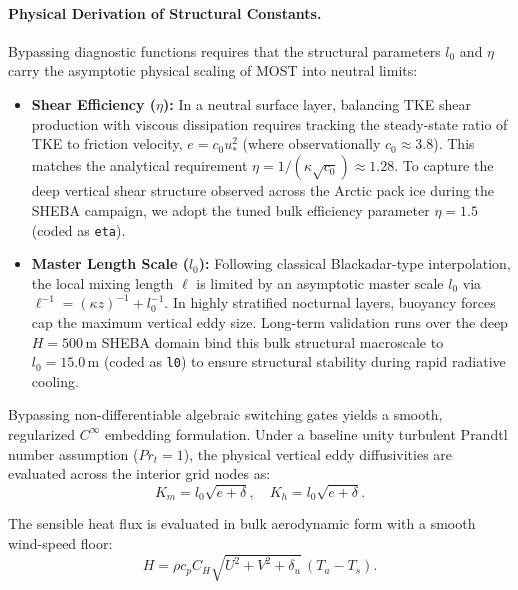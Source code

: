 \documentclass[11pt,letterpaper]{article}
\begin{document}
\paragraph{Physical Derivation of Structural Constants.}
Bypassing diagnostic functions requires that the structural parameters $l_0$ and $\eta$ carry the asymptotic physical scaling of MOST into neutral limits:
\begin{itemize}
    \item \textbf{Shear Efficiency ($\eta$):} In a neutral surface layer, balancing TKE shear production with viscous dissipation requires tracking the steady-state ratio of TKE to friction velocity, $e = c_0 u_*^2$ (where observationally $c_0 \approx 3.8$). This matches the analytical requirement $\eta = 1 / (\kappa \sqrt{c_0}) \approx 1.28$. To capture the deep vertical shear structure observed across the Arctic pack ice during the SHEBA campaign, we adopt the tuned bulk efficiency parameter $\eta = 1.5$ (coded as \texttt{eta}).
    \item \textbf{Master Length Scale ($l_0$):} Following classical Blackadar-type interpolation, the local mixing length $\ell$ is limited by an asymptotic master scale $l_0$ via $\ell^{-1} = (\kappa z)^{-1} + l_0^{-1}$. In highly stratified nocturnal layers, buoyancy forces cap the maximum vertical eddy size. Long-term validation runs over the deep $H = 500\,\mathrm{m}$ SHEBA domain bind this bulk structural macroscale to $l_0 = 15.0\,\mathrm{m}$ (coded as \texttt{l0}) to ensure structural stability during rapid radiative cooling.
\end{itemize}

Bypassing non-differentiable algebraic switching gates yields a smooth, regularized $C^\infty$ embedding formulation. Under a baseline unity turbulent Prandtl number assumption ($Pr_t = 1$), the physical vertical eddy diffusivities are evaluated across the interior grid nodes as:
\begin{equation}
K_m = l_0 \sqrt{e + \delta}, \quad K_h = l_0 \sqrt{e + \delta}.
\label{eq:embedded_diffusivities}
\end{equation}

The sensible heat flux is evaluated in bulk aerodynamic form with a smooth wind-speed floor:
\begin{equation}
H = \rho c_p C_H \sqrt{U^2 + V^2 + \delta_u}\,(T_a - T_s).
\label{eq:bulk_heat_flux}
\end{equation}
\end{document}
